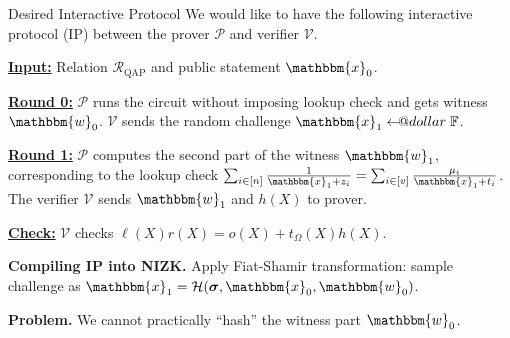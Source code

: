 \documentclass{zkdl-presentation-template}
\makeatletter
\newcommand\leftarrowS{\leftarrow\joinrel\smalldollar}
\newcommand{\smalldollar}{\mathrel{\mathpalette\small@dollar\relax}}
\newcommand{\small@dollar}[2]{%
  \vcenter{\hbox{%
    $#1\textnormal{\fontsize{0.7\dimexpr\f@size pt}{0}\selectfont\$}$%
  }}%
}
\makeatother
\begin{document}
    \begin{frame}{Desired Interactive Protocol}
        We would like to have the following interactive protocol (IP) between
        the prover $\mathcal{P}$ and verifier $\mathcal{V}$.
        \begin{mdframed}[linewidth=1pt]
        \underline{\textbf{Input:}} Relation $\mathcal{R}_{\text{QAP}}$ and public statement
        $\mathbbm{x}_0$.

        \underline{\textbf{Round 0:}} $\mathcal{P}$ runs the circuit without imposing lookup
        check and gets witness $\mathbbm{w}_0$. $\mathcal{V}$ sends the random
        challenge $\mathbbm{x}_1 \leftarrowS \mathbb{F}$.

        \underline{\textbf{Round 1:}} $\mathcal{P}$ computes the second part of the witness
        $\mathbbm{w}_1$, corresponding to the lookup check $\sum_{i \in
        [n]}\frac{1}{\mathbbm{x}_1+z_i} = \sum_{i \in
        [v]}\frac{\mu_i}{\mathbbm{x}_1+t_i}$. The verifier $\mathcal{V}$ sends 
        $\mathbbm{w}_1$ and $h(X)$ to prover.

        \underline{\textbf{Check:}} $\mathcal{V}$ checks $\ell(X)r(X) = o(X) +
        t_{\Omega}(X)h(X)$.
        \end{mdframed}

        \textbf{Compiling IP into NIZK.} Apply Fiat-Shamir transformation:
        sample challenge as $\mathbbm{x}_1=\mathcal{H}(\boldsymbol{\sigma},
        \mathbbm{x}_0, \mathbbm{w}_0)$.

        \textcolor{red!70!black}{\textbf{Problem.}} We cannot practically
        ``hash'' the witness part $\mathbbm{w}_0$.
    \end{frame}
\end{document}
